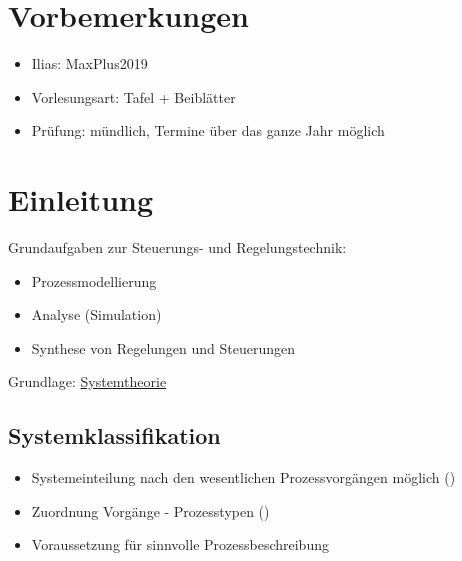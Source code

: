 \section*{Vorbemerkungen}
\begin{itemize}
	\item Ilias: MaxPlus2019
	\item Vorlesungsart: Tafel + Beiblätter
	\item Prüfung: mündlich, Termine über das ganze Jahr möglich
\end{itemize}

\section{Einleitung}
Grundaufgaben zur Steuerungs- und Regelungstechnik:
\begin{itemize}
	\item Prozessmodellierung
	\item Analyse (Simulation)
	\item Synthese von Regelungen und Steuerungen 
\end{itemize}
Grundlage: \underline{Systemtheorie}

\subsection{Systemklassifikation}
\begin{itemize}
	\item Systemeinteilung nach den wesentlichen Prozessvorgängen möglich ()
	\item Zuordnung Vorgänge - Prozesstypen ()
	\item Voraussetzung für sinnvolle Prozessbeschreibung
\end{itemize}



